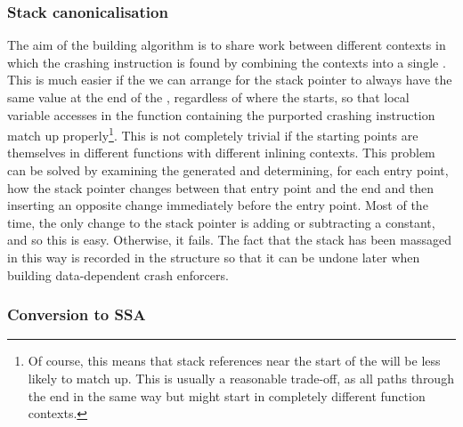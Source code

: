 \subsubsection{Stack canonicalisation}

The aim of the {\StateMachine} building algorithm is to share work
between different contexts in which the crashing instruction is found
by combining the contexts into a single {\StateMachine}.  This is much
easier if the we can arrange for the stack pointer to always have the
same value at the end of the {\StateMachine}, regardless of where the
{\StateMachine} starts, so that local variable accesses in the
function containing the purported crashing instruction match up
properly\footnote{Of course, this means that stack references near the
  start of the {\StateMachine} will be less likely to match up.  This
  is usually a reasonable trade-off, as all paths through the
  {\StateMachine} end in the same way but might start in completely
  different function contexts.}.  This is not completely trivial if
the starting points are themselves in different functions with
different inlining contexts.  This problem can be solved by examining
the generated {\StateMachine} and determining, for each entry point,
how the stack pointer changes between that entry point and the end and
then inserting an opposite change immediately before the entry point.
Most of the time, the only change to the stack pointer is adding or
subtracting a constant, and so this is easy.  Otherwise, it fails.
The fact that the stack has been massaged in this way is recorded in
the {\StateMachine} structure so that it can be undone later when
building data-dependent crash enforcers.


\subsubsection{Conversion to SSA}
\label{sect:ssa}


